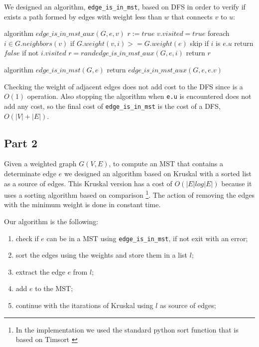 \documentclass[paper=a4, fontsize=11pt]{scrartcl} %
\numberwithin{equation}{section} %
\numberwithin{figure}{section} %
\numberwithin{table}{section} %
\begin{document}
We designed an algorithm, \verb|edge_is_in_mst|, based on DFS in order to verify if exists a path formed by edges with weight less than $w$ that connects $v$ to $u$:

\begin{pseudo}
algorithm $edge\_is\_in\_mst\_aux(G, e, v)$
    $r := true$
    $v.visited = true$
    foreach $i \in G.neighbors(v)$
        if $G.weight(v, i) >= G.weight(e)$
            skip
        if $i$ is $e.u$
            return $false$
        if not $i.visited$
            $r = r and edge\_is\_in\_mst\_aux(G, e, i)$
    return $r$
\end{pseudo}
\begin{pseudo}
algorithm $edge\_is\_in\_mst(G, e)$
    return $edge\_is\_in\_mst\_aux(G, e, e.v)$
\end{pseudo}

Checking the weight of adjacent edges does not add cost to the DFS since is a $O(1)$ operation. Also stopping the algorithm when \verb|e.u| is encountered does not add any cost, so the final cost of \verb|edge_is_in_mst| is the cost of a DFS, $O(|V|+|E|)$.

\subsection*{Part 2}

Given a weighted graph $G(V, E)$, to compute an MST that contains a determinate edge $e$ we designed an algorithm based on Kruskal with a sorted list as a source of edges.
This Kruskal version has a cost of $O(|E|log|E|)$ because it uses a sorting algorithm based on comparison \footnote{In the implementation we used the standard python sort function that is based on Timsort \cite{timsort}}. The action of removing the edges with the minimum weight is done in constant time.

Our algorithm is the following:

\begin{enumerate}
    \item check if $e$ can be in a MST using \verb|edge_is_in_mst|, if not exit with an error;
    \item sort the edges using the weights and store them in a list $l$;
    \item extract the edge $e$ from $l$;
    \item add $e$ to the MST;
    \item continue with the itarations of Kruskal using $l$ as source of edges;
\end{enumerate}
\end{document}
